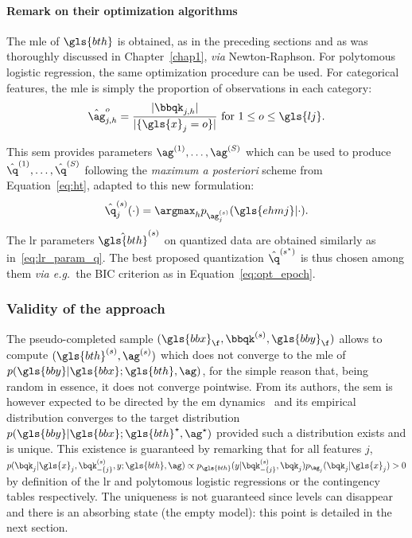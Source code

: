 \paragraph{Remark on their optimization algorithms}

The \gls{mle} of $\gls{bth}$ is obtained, as in the preceding sections and as was thoroughly discussed in Chapter~\ref{chap1}, \textit{via} Newton-Raphson. For polytomous logistic regression, the same optimization procedure can be used. For categorical features, the \gls{mle} is simply the proportion of observations in each category:
\[ \hat{\ag}_{j,h}^o = \frac{|\bbqk_{j,h}|}{|\{\gls{x}_j=o\}|} \text{ for } 1 \leq o \leq \gls{lj}. \]

This \gls{sem} provides parameters ${\ag}^{(1)}, \dots, {\ag}^{(S)}$ which can be used to produce $\hat{\q}^{(1)}, \dots, \hat{\q}^{(S)}$ following the \textit{maximum a posteriori} scheme from Equation~\eqref{eq:ht}, adapted to this new formulation:
\[ \hat{\q}_j^{(s)}(\cdot) = \argmax_{h} p_{\ag_j^{(s)}}(\gls{ehmj} | \cdot ) .\]
The \gls{lr} parameters $\hat{\gls{bth}}^{(s)}$ on quantized data are obtained similarly as in~\eqref{eq:lr_param_q}. The best proposed quantization $\hat{\q}^{(s^\star)}$ is thus chosen among them \textit{via e.g.}\ the BIC criterion as in Equation~\eqref{eq:opt_epoch}.


\subsubsection{Validity of the approach}

The pseudo-completed sample $(\gls{bbx}_{\f}, \bbqk^{(s)}, \gls{bby}_{\f})$ allows to compute $({\gls{bth}}^{(s)},{\ag}^{(s)})$ which does not converge to the \gls{mle} of $p(\gls{bby} | \gls{bbx}; \gls{bth}, \ag)$, for the simple reason that, being random in essence, it does not converge pointwise. From its authors, the \gls{sem} is however expected to be directed by the \gls{em} dynamics~\cite{celeux_sem} and its empirical distribution converges to the target distribution $p(\gls{bby} | \gls{bbx}; \gls{bth}^\star, \ag^\star)$ provided such a distribution exists and is unique. This existence is guaranteed by remarking that for all features $j$, $ p(\bqk_j | \gls{x}_j, \bqk^{(s)}_{-\{j\}}, y; \gls{bth}, \ag) \propto p_{\gls{bth}}(y | \bqk^{(s)}_{-\{j\}}, \bqk_j) p_{\ag_j}(\bqk_j | \gls{x}_j) > 0 $ by definition of the \gls{lr} and polytomous logistic regressions or the contingency tables respectively. The uniqueness is not guaranteed since levels can disappear and there is an absorbing state (the empty model): this point is detailed in the next section.


